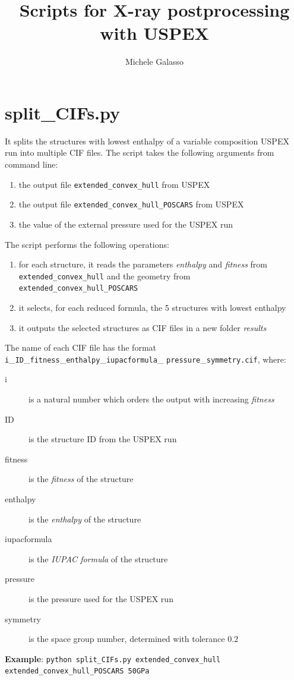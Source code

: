 \documentclass{article}
\begin{document}
\title{Scripts for X-ray postprocessing with USPEX}
\author{Michele Galasso}

\maketitle


\section{split\_CIFs.py}
It splits the structures with lowest enthalpy of a variable composition USPEX run into multiple CIF files. The script takes the following arguments from command line:
\begin{enumerate}
	\item the output file \texttt{extended\_convex\_hull} from USPEX
	\item the output file \texttt{extended\_convex\_hull\_POSCARS} from USPEX
	\item the value of the external pressure used for the USPEX run
\end{enumerate}
The script performs the following operations:
\begin{enumerate}
	\item for each structure, it reads the parameters \emph{enthalpy} and \emph{fitness} from \texttt{extended\_convex\_hull} and the geometry from \texttt{extended\_convex\_hull\_POSCARS}
	\item it selects, for each reduced formula, the 5 structures with lowest enthalpy
	\item it outputs the selected structures as CIF files in a new folder \textit{results}
\end{enumerate}
The name of each CIF file has the format \texttt{i}\_\texttt{ID}\_\texttt{fitness}\_\texttt{enthalpy}\_\texttt{iupacformula}\_ \texttt{pressure}\_\texttt{symmetry.cif}, where:
\begin{description}
	\item[i] is a natural number which orders the output with increasing \emph{fitness}
	\item[ID] is the structure ID from the USPEX run
	\item[fitness] is the \emph{fitness} of the structure
	\item[enthalpy] is the \emph{enthalpy} of the structure
	\item[iupacformula] is the \emph{IUPAC formula} of the structure
	\item[pressure] is the pressure used for the USPEX run
	\item[symmetry] is the space group number, determined with tolerance $0.2$\end{description}
\textbf{Example}: \texttt{python split\_CIFs.py extended\_convex\_hull \\ extended\_convex\_hull\_POSCARS 50GPa}
\end{document}
